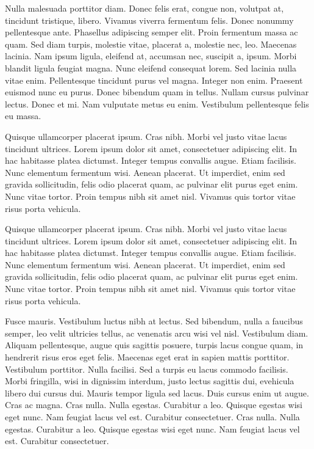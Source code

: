 \documentclass[CJCE,STIX2COL]{WileyNJD-v2}
\begin{document}
Nulla malesuada porttitor diam. Donec felis erat, congue non, volutpat at, tincidunt tristique, libero. Vivamus
viverra fermentum felis. Donec nonummy pellentesque ante. Phasellus adipiscing semper elit. Proin fermentum massa
ac quam. Sed diam turpis, molestie vitae, placerat a, molestie nec, leo. Maecenas lacinia. Nam ipsum ligula, eleifend
at, accumsan nec, suscipit a, ipsum. Morbi blandit ligula feugiat magna. Nunc eleifend consequat lorem. Sed lacinia
nulla vitae enim. Pellentesque tincidunt purus vel magna. Integer non enim. Praesent euismod nunc eu purus. Donec
bibendum quam in tellus. Nullam cursus pulvinar lectus. Donec et mi. Nam vulputate metus eu enim. Vestibulum
pellentesque felis eu massa.

Quisque ullamcorper placerat ipsum. Cras nibh. Morbi vel justo vitae lacus tincidunt ultrices. Lorem ipsum dolor sit
amet, consectetuer adipiscing elit. In hac habitasse platea dictumst. Integer tempus convallis augue. Etiam facilisis.
Nunc elementum fermentum wisi. Aenean placerat. Ut imperdiet, enim sed gravida sollicitudin, felis odio placerat
quam, ac pulvinar elit purus eget enim. Nunc vitae tortor. Proin tempus nibh sit amet nisl. Vivamus quis tortor
vitae risus porta vehicula.

\begin{table}
\end{table}

Quisque ullamcorper placerat ipsum. Cras nibh. Morbi vel justo vitae lacus tincidunt ultrices. Lorem ipsum dolor sit
amet, consectetuer adipiscing elit. In hac habitasse platea dictumst. Integer tempus convallis augue. Etiam facilisis.
Nunc elementum fermentum wisi. Aenean placerat. Ut imperdiet, enim sed gravida sollicitudin, felis odio placerat
quam, ac pulvinar elit purus eget enim. Nunc vitae tortor. Proin tempus nibh sit amet nisl. Vivamus quis tortor
vitae risus porta vehicula.

Fusce mauris. Vestibulum luctus nibh at lectus. Sed bibendum, nulla a faucibus semper, leo velit ultricies tellus, ac
venenatis arcu wisi vel nisl. Vestibulum diam. Aliquam pellentesque, augue quis sagittis posuere, turpis lacus congue
quam, in hendrerit risus eros eget felis. Maecenas eget erat in sapien mattis porttitor. Vestibulum porttitor. Nulla
facilisi. Sed a turpis eu lacus commodo facilisis. Morbi fringilla, wisi in dignissim interdum, justo lectus sagittis dui, 
evehicula libero dui cursus dui. Mauris tempor ligula sed lacus. Duis cursus enim ut augue. Cras ac magna. Cras nulla.
Nulla egestas. Curabitur a leo. Quisque egestas wisi eget nunc. Nam feugiat lacus vel est. Curabitur consectetuer. Cras nulla.
Nulla egestas. Curabitur a leo. Quisque egestas wisi eget nunc. Nam feugiat lacus vel est. Curabitur consectetuer.
\end{document}
